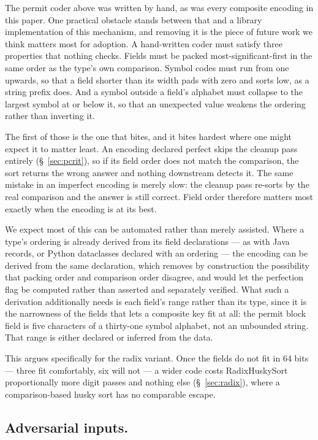 \documentclass[twoside,leqno,twocolumn]{article}
\begin{document}
The permit coder above was written by hand, as was every composite encoding in this paper.
One practical obstacle stands between that and a library implementation of this mechanism,
and removing it is the piece of future work we think matters most for adoption.
A hand-written coder must satisfy three properties that nothing checks.
Fields must be packed most-significant-first in the same order as the type's own comparison.
Symbol codes must run from one upwards, so that a field shorter than its width pads with zero and
sorts low, as a string prefix does.
And a symbol outside a field's alphabet must collapse to the largest symbol at or below it,
so that an unexpected value weakens the ordering rather than inverting it.

The first of those is the one that bites, and it bites hardest where one might expect it to matter
least.
An encoding declared perfect skips the cleanup pass entirely (\S~\ref{sec:pcrit}),
so if its field order does not match the comparison, the sort returns the wrong answer and nothing
downstream detects it.
The same mistake in an imperfect encoding is merely slow: the cleanup pass re-sorts by the real
comparison and the answer is still correct.
Field order therefore matters most exactly when the encoding is at its best.

We expect most of this can be automated rather than merely assisted.
Where a type's ordering is already derived from its field declarations ---
as with Java records, or Python dataclasses declared with an ordering ---
the encoding can be derived from the same declaration,
which removes by construction the possibility that packing order and comparison order disagree,
and would let the perfection flag be computed rather than asserted and separately verified.
What such a derivation additionally needs is each field's range rather than its type,
since it is the narrowness of the fields that lets a composite key fit at all:
the permit block field is five characters of a thirty-one symbol alphabet, not an unbounded string.
That range is either declared or inferred from the data.

This argues specifically for the radix variant.
Once the fields do not fit in 64 bits --- three fit comfortably, six will not ---
a wider code costs RadixHuskySort proportionally more digit passes and nothing else (\S~\ref{sec:radix}),
where a comparison-based husky sort has no comparable escape.

\subsection{Adversarial inputs.}
\label{sec:adversarial}
\end{document}
